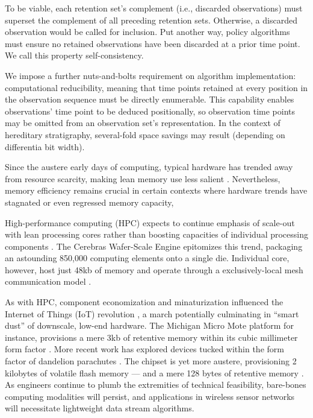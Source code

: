 To be viable, each retention set's complement (i.e., discarded observations) must superset the complement of all preceding retention sets.
Otherwise, a discarded observation would be called for inclusion.
Put another way, policy algorithms must ensure no retained observations have been discarded at a prior time point.
We call this property self-consistency.

We impose a further nuts-and-bolts requirement on algorithm implementation: computational reducibility, meaning that time points retained at every position in the observation sequence must be directly enumerable.
This capability enables observations' time point to be deduced positionally, so observation time points may be omitted from an observation set's representation.
In the context of hereditary stratigraphy, several-fold space savings may result (depending on differentia bit width).

Since the austere early days of computing, typical hardware has trended away from resource scarcity, making lean memory use less salient \citep{kushida2015cloud}.
Nevertheless, memory efficiency remains crucial in certain contexts where hardware trends have stagnated or even regressed memory capacity,

High-performance computing (HPC) expects to continue emphasis of scale-out with lean processing cores rather than boosting capacities of individual processing components \citep{sutter2005free,morgenstern2021unparalleled}.
The Cerebras Wafer-Scale Engine epitomizes this trend, packaging an astounding 850,000 computing elements onto a single die.
Individual core, however, host just 48kb of memory and operate through a exclusively-local mesh communication model \citep{cerebras2021wafer,lauterbach2021path}.

As with HPC, component economization and minaturization influenced the Internet of Things (IoT) revolution \citep{rfc7228,ojo2018review}, a march potentially culminating in ``smart dust'' \citep{warneke2001smart} of downscale, low-end hardware.
The Michigan Micro Mote platform for instance, provisions a mere 3kb of retentive memory within its cubic millimeter form factor \citep{lee2012modular}.
More recent work has explored devices tucked within the form factor of dandelion parachutes \citep{iyer2022wind}.
The chipset is yet more austere, provisioning 2 kilobytes of volatile flash memory --- and a mere 128 bytes of retentive memory \citep{microchip2014atiny20}.
As engineers continue to plumb the extremities of technical feasibility, bare-bones computing modalities will persist, and applications in wireless sensor networks will necessitate lightweight data stream algorithms.

